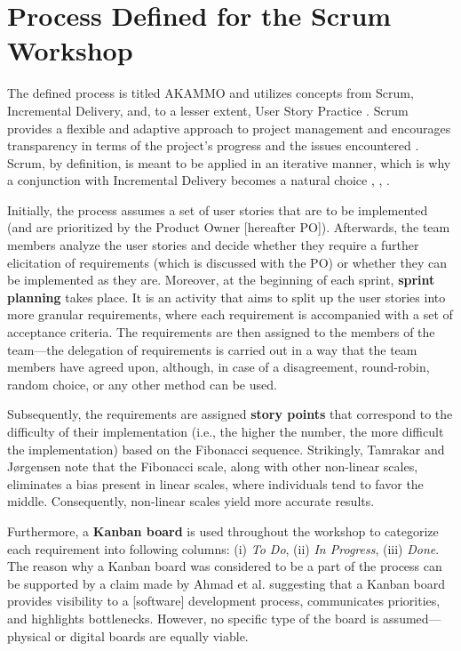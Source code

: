 \documentclass[conference]{IEEEtran}
\begin{document}
\section{Process Defined for the Scrum Workshop}
\label{sec:process}


The defined process is titled {\selectfont AKAMMO} and
utilizes concepts from Scrum, Incremental Delivery, and, to a lesser extent,
User Story Practice \cite{DIT348A1}. Scrum provides a flexible and adaptive
approach to project management and encourages transparency in terms of the
project's progress and the issues encountered \cite{Schwaber2020}. Scrum, by
definition, is meant to be applied in an iterative manner, which is why a
conjunction with Incremental Delivery becomes a natural choice
\cite{Schwaber2020}, \cite{Srivastava2017}, \cite{Schwaber1997}.

Initially, the process assumes a set of user stories that are to be implemented
(and are prioritized by the Product Owner [hereafter PO]). Afterwards, the team
members analyze the user stories and decide whether they require a further
elicitation of requirements (which is discussed with the PO) or whether they
can be implemented as they are.
Moreover, at the beginning of each sprint, \textbf{sprint planning} takes
place. It is an activity that aims to split up the user stories into more
granular requirements, where each requirement is accompanied with a set of
acceptance criteria. The requirements are then assigned to the members of
the team---the delegation of requirements is carried out in a way that the team
members have agreed upon, although, in case of a disagreement, round-robin,
random choice, or any other method can be used. 

Subsequently, the requirements are assigned \textbf{story points} that
correspond to the difficulty of their implementation (i.e., the higher
the number, the more difficult the implementation) based on the Fibonacci
sequence. Strikingly, Tamrakar and J\o{}rgensen \cite{Tamrakar2012} note that
the Fibonacci scale, along with other non-linear scales, eliminates a bias
present in linear scales, where individuals tend to favor the middle.
Consequently, non-linear scales yield more accurate results.

Furthermore, a \textbf{Kanban board} is used throughout the workshop to
categorize each requirement into following columns: (i) \textit{To Do}, (ii)
\textit{In Progress}, (iii) \textit{Done}. The reason why a Kanban board was
considered to be a part of the process can be supported by a claim made by
Ahmad et al. \cite{Ahmad2014} suggesting that a Kanban board provides
visibility to a [software] development process, communicates priorities, and
highlights bottlenecks. However, no specific type of the board is
assumed---physical or digital boards are equally viable.
\end{document}
